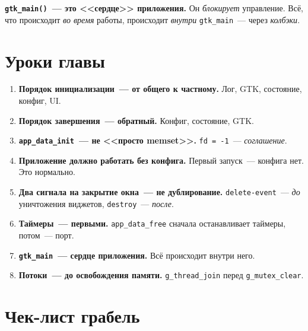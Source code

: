 \begin{keybox}
\textbf{\texttt{gtk\_main()}~--- это <<сердце>> приложения.}
Он \emph{блокирует} управление. Всё, что происходит
\emph{во время} работы, происходит \emph{внутри}
\texttt{gtk\_main}~--- через \emph{колбэки}.
\end{keybox}

\section{Уроки главы}
\label{sec:lifecycle-lessons}

\begin{enumerate}
    \item \textbf{Порядок инициализации~--- от общего
          к частному.} Лог, GTK, состояние, конфиг, UI.
    \item \textbf{Порядок завершения~--- обратный.}
          Конфиг, состояние, GTK.
    \item \textbf{\texttt{app\_data\_init}~--- не <<просто
          memset>>.} \texttt{fd = -1}~--- \emph{соглашение}.
    \item \textbf{Приложение должно работать без конфига.}
          Первый запуск~--- конфига нет. Это нормально.
    \item \textbf{Два сигнала на закрытие окна~--- не
          дублирование.} \texttt{delete-event}~--- \emph{до}
          уничтожения виджетов, \texttt{destroy}~--- \emph{после}.
    \item \textbf{Таймеры~--- первыми.} \texttt{app\_data\_free}
          сначала останавливает таймеры, потом~--- порт.
    \item \textbf{\texttt{gtk\_main}~--- сердце приложения.}
          Всё происходит внутри него.
    \item \textbf{Потоки~--- до освобождения памяти.}
          \texttt{g\_thread\_join} перед \texttt{g\_mutex\_clear}.
\end{enumerate}

\section{Чек-лист грабель}
\label{sec:lifecycle-pitfalls}

